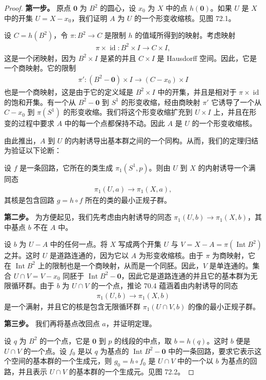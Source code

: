 \documentclass[../../main.tex]{subfiles}
\begin{document}
\begin{proof}
\textbf{第一步。} 原点 $\mathbf{0}$ 为 $B^2$ 的圆心，设 $x_0$ 为 $X$ 中的点 $h(\mathbf{0})$。如果 $U$ 是 $X$ 中的开集 $U=X-x_0$，我们证明 $A$ 为 $U$ 的一个形变收缩核。见图 72.1。


设 $C=h(B^2)$，令 $\pi:B^2\to C$ 是限制 $h$ 的值域所得到的映射。考虑映射
\begin{align*}
\pi\times\operatorname{id}:B^2\times I\to C\times I,
\end{align*}
这是一个闭映射，因为 $B^2\times I$ 是紧的并且 $C\times I$ 是 Hausdorff 空间。因此，它是一个商映射。它的限制
\begin{align*}
\pi':(B^2-\mathbf{0})\times I\to(C-x_0)\times I
\end{align*}
也是一个商映射，这是由于它的定义域是 $B^2\times I$ 中的开集，并且是相对于 $\pi\times\operatorname{id}$ 的饱和开集。有一个从 $B^2-\mathbf{0}$ 到 $S^1$ 的形变收缩，经由商映射 $\pi'$ 它诱导了一个从 $C-x_0$ 到 $\pi(S^1)$ 的形变收缩。我们将这个形变收缩扩充到 $U\times I$ 上，并且在形变的过程中要求 $A$ 中的每一个点都保持不动。因此 $A$ 是 $U$ 的一个形变收缩核。

由此推出，$A$ 到 $U$ 的内射诱导出基本群之间的一个同构。从而，我们的定理归结为验证以下论断：

设 $f$ 是一条回路，它所在的类生成 $\pi_1(S^1,p)$。则由 $U$ 到 $X$ 的内射诱导一个满同态
\begin{align*}
\pi_1(U,a)\to\pi_1(X,a),
\end{align*}
其核是包含回路 $g=h\circ f$ 所在的类的最小正规子群。

\textbf{第二步。} 为方便起见，我们先考虑由内射诱导的同态 $\pi_1(U,b)\to\pi_1(X,b)$，其中基点 $b$ 不在 $A$ 中。

设 $b$ 为 $U-A$ 中的任何一点。将 $X$ 写成两个开集 $U$ 与 $V=X-A=\pi(\operatorname{Int}B^2)$ 之并。这时 $U$ 是道路连通的，因为它以 $A$ 为形变收缩核。由于 $\pi$ 为商映射，它在 $\operatorname{Int}B^2$ 上的限制也是一个商映射，从而是一个同胚。因此，$V$ 是单连通的。集合 $U\cap V=V-x_0$ 同胚于 $\operatorname{Int}B^2-\mathbf{0}$，因此它是道路连通的并且它的基本群为无限循环群。由于 $b$ 为 $U\cap V$ 的一个点，推论 70.4 蕴涵着由内射诱导的同态
\begin{align*}
\pi_1(U,b)\to\pi_1(X,b)
\end{align*}
是一个满射，并且它的核是包含无限循环群 $\pi_1(U\cap V,b)$ 的像的最小正规子群。

\textbf{第三步。} 我们再将基点改回点 $a$，并证明定理。

设 $q$ 为 $B^2$ 的一个点，它是 $\mathbf{0}$ 到 $p$ 的线段的中点，取 $b=h(q)$。这时 $b$ 便是 $U\cap V$ 的一个点。设 $f_0$ 是以 $q$ 为基点的 $\operatorname{Int}B^2-\mathbf{0}$ 中的一条回路，要求它表示这个空间的基本群的一个生成元，则 $g_0=h\circ f_0$ 是 $U\cap V$ 中的一个以 $b$ 为基点的回路，并且表示 $U\cap V$ 的基本群的一个生成元。见图 72.2。



\end{proof}
\end{document}

